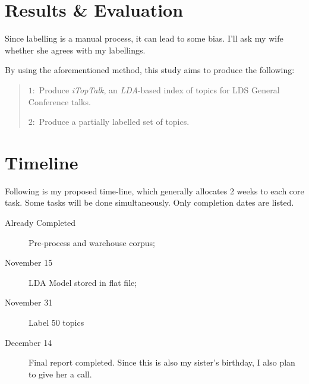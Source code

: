 \section {Results \& Evaluation}
Since labelling is a manual process, it can lead to some bias. I'll ask my wife whether she agrees with my labellings. 

By using the aforementioned method, this study aims to produce the following:
	\begin{quote}
		${1}:$ Produce \emph{iTopTalk}, an \emph{LDA}-based index of topics for LDS General Conference talks.
		
		${2}:$ Produce a partially labelled set of topics.
	\end{quote}

\section {Timeline}

Following is my proposed time-line, which generally allocates 2 weeks to each core task. Some tasks will be done simultaneously. Only completion dates are listed.

\begin{description}
    \item [Already Completed] Pre-process and warehouse corpus;
    \item [November 15] LDA Model stored in flat file;
    \item [November 31] Label 50 topics
    \item [December 14] Final report completed. Since this is also my sister's birthday, I also plan to give her a call.
\end{description}